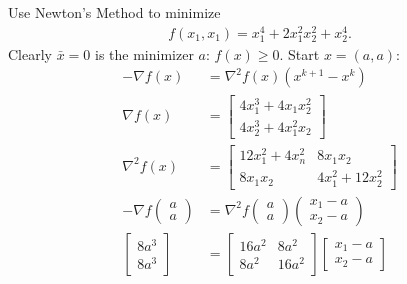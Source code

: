 \documentclass[11pt]{article}
\numberwithin{equation}{section}
\begin{document}
\begin{example}
    Use Newton's Method to minimize \begin{align*}
        f\left(x_{1}, x_{1}\right)=x_{1}^{4}+2 x_{1}^{2} x_{2}^{2}+x_{2}^{4}.
    \end{align*}
    Clearly $\bar{x}=0$ is the minimizer $a$: $f(x) \geq 0$. Start $x=(a,a)$: \begin{align*}
        -\nabla f\left(x\right) &= \nabla^{2} f\left(x\right)\left(x^{k+1}-x^{k}\right) \\
        \nabla f(x) &= \left[\begin{array}{l}
            4 x_{1}^{3}+4 x_{1} x_{2}^{2} \\
            4 x_{2}^{3}+4 x_{1}^{2} x_{2}
            \end{array}\right] \\
        \nabla^2 f(x) &= \left[\begin{array}{ll}
            12 x_{1}^{2}+4 x_{n}^{2} & 8 x_{1} x_{2} \\
            8 x_{1} x_{2} & 4 x_{1}^{2}+12 x_{2}^{2}
            \end{array}\right] \\
        -\nabla f\left(\begin{array}{l}
            a \\
            a
            \end{array}\right) &= \nabla^2 f\left(\begin{array}{l}
            a \\
            a
            \end{array}\right)\left(\begin{array}{l}
            x_{1} - a \\
            x_{2} - a
            \end{array}\right) \\
            \left[\begin{array}{c}
                8 a^{3} \\
                8 a^{3}
                \end{array}\right] &= \left[\begin{array}{cc}
                16 a^{2} & 8 a^{2} \\
                8 a^{2} & 16 a^{2}
                \end{array}\right]\left[\begin{array}{c}
                x_{1}-a \\
                x_{2} - a
                \end{array}\right]

\end{align*}
\end{example}
\end{document}
